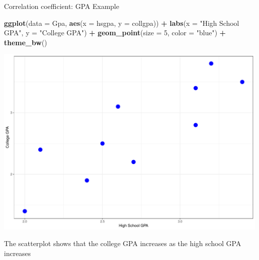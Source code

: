 \documentclass[
  ignorenonframetext,
]{beamer}
\newenvironment{Shaded}{\begin{snugshade}}{\end{snugshade}}
\newcommand{\AttributeTok}[1]{\textcolor[rgb]{0.13,0.29,0.53}{#1}}
\newcommand{\DecValTok}[1]{\textcolor[rgb]{0.00,0.00,0.81}{#1}}
\newcommand{\FunctionTok}[1]{\textcolor[rgb]{0.13,0.29,0.53}{\textbf{#1}}}
\newcommand{\NormalTok}[1]{#1}
\newcommand{\SpecialCharTok}[1]{\textcolor[rgb]{0.81,0.36,0.00}{\textbf{#1}}}
\newcommand{\StringTok}[1]{\textcolor[rgb]{0.31,0.60,0.02}{#1}}
\begin{document}
\begin{frame}[fragile]{Correlation coefficient: GPA Example}
\protect\hypertarget{correlation-coefficient-gpa-example}{}
\normalsize

\begin{Shaded}
\begin{Highlighting}[]
\FunctionTok{ggplot}\NormalTok{(}\AttributeTok{data =}\NormalTok{ Gpa, }\FunctionTok{aes}\NormalTok{(}\AttributeTok{x =}\NormalTok{ hsgpa, }\AttributeTok{y =}\NormalTok{ collgpa)) }\SpecialCharTok{+} 
  \FunctionTok{labs}\NormalTok{(}\AttributeTok{x =} \StringTok{"High School GPA"}\NormalTok{, }\AttributeTok{y =} \StringTok{"College GPA"}\NormalTok{) }\SpecialCharTok{+}
  \FunctionTok{geom\_point}\NormalTok{(}\AttributeTok{size =} \DecValTok{5}\NormalTok{, }\AttributeTok{color =} \StringTok{"blue"}\NormalTok{) }\SpecialCharTok{+} 
  \FunctionTok{theme\_bw}\NormalTok{()}
\end{Highlighting}
\end{Shaded}

\begin{center}\includegraphics[width=0.5\linewidth,height=0.5\textheight]{Week4_Lect_files/figure-beamer/unnamed-chunk-8-1} \end{center}
\normalsize

The scatterplot shows that the college GPA increases as the high school
GPA increases
\end{frame}
\end{document}
